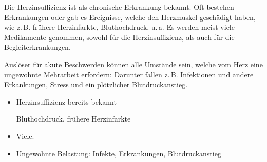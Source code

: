{ Die Herzinsuffizienz ist als chronische
Erkrankung bekannt. Oft bestehen Erkrankungen oder gab es
Ereignisse, welche den Herzmuskel geschädigt haben, wie
z.\,B. frühere Herzinfarkte, Bluthochdruck, u.\,a.
 Es werden meist viele Medikamente genommen, sowohl
für die Herzinsuffizienz, als auch für die
Begleiterkrankungen. 

 Auslöser für akute Beschwerden können alle
Umstände sein, welche vom Herz eine ungewohnte Mehrarbeit
erfordern: Darunter fallen z.\,B. Infektionen und andere
Erkankungen, Stress und ein plötzlicher Blutdruckanstieg.

}
{
\begin{itemize}
  \item[\KAMEL{K}] Herzinsuffizienz bereits bekannt
  
  Bluthochdruck, frühere Herzinfarkte
  \item[\KAMEL{M}] Viele. 
  \item[\KAMEL{E}] Ungewohnte Belastung: Infekte,
  Erkrankungen, Blutdruckanstieg
\end{itemize}
}
{}
{}
{}

% 












